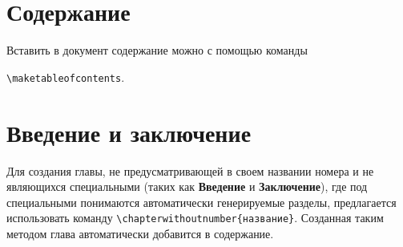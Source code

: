 \section{Содержание}

Вставить в документ содержание можно с помощью команды

\lstinline:\maketableofcontents:.

\section{Введение и заключение}

Для создания главы, не предусматривающей в своем названии номера и
не являющихся специальными (таких как \textbf{Введение} и \textbf{Заключение}),
где под специальными понимаются автоматически генерируемые разделы, предлагается
использовать команду \lstinline:\chapterwithoutnumber{название}:. Созданная
таким методом глава автоматически добавится в содержание.